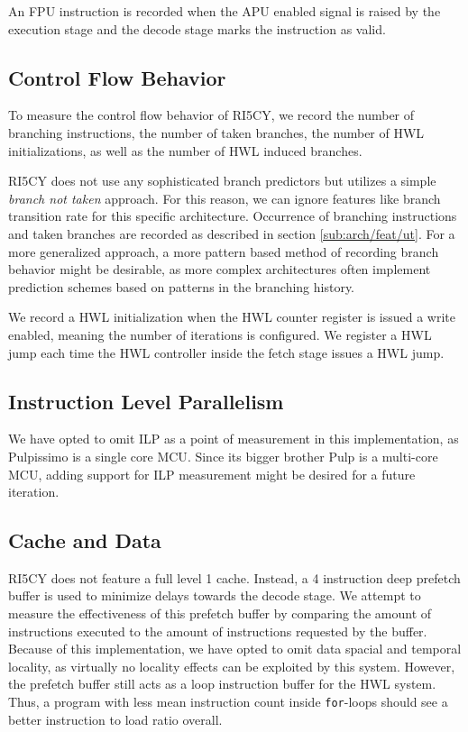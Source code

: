 \documentclass[../bachelor_paper.tex]{subfiles}
\begin{document}
An \ac{FPU} instruction is recorded when the \ac{APU} enabled signal is raised by the execution stage and the decode stage marks the instruction as valid.

\subsection{Control Flow Behavior}
    \label{sub:arch/feat/ctrl}
To measure the control flow behavior of RI5CY, we record the number of branching instructions, the number of taken branches, the number of \ac{HWL} initializations, as well as the number of \ac{HWL} induced branches.

RI5CY does not use any sophisticated branch predictors but utilizes a simple \emph{branch not taken} approach. For this reason, we can ignore features like branch transition rate \cite{haungsBranchTransitionRate2000} for this specific architecture. Occurrence of branching instructions and taken branches are recorded as described in section \ref{sub:arch/feat/ut}. For a more generalized approach, a more pattern based method of recording branch behavior might be desirable, as more complex architectures often implement prediction schemes based on patterns in the branching history.

We record a \ac{HWL} initialization when the \ac{HWL} counter register is issued a write enabled, meaning the number of iterations is configured. We register a \ac{HWL} jump each time the \ac{HWL} controller inside the fetch stage issues a \ac{HWL} jump.

\subsection{Instruction Level Parallelism}
We have opted to omit \ac{ILP} as a point of measurement in this implementation, as Pulpissimo is a single core \ac{MCU}. Since its bigger brother Pulp \cite{pulliniMrWolfEnergyPrecision2019} is a multi-core \ac{MCU}, adding support for \ac{ILP} measurement might be desired for a future iteration.

\subsection{Cache and Data}
RI5CY does not feature a full level 1 cache. Instead, a 4 instruction deep prefetch buffer is used to minimize delays towards the decode stage. We attempt to measure the effectiveness of this prefetch buffer by comparing the amount of instructions executed to the amount of instructions requested by the buffer. Because of this implementation, we have opted to omit data spacial and temporal locality, as virtually no locality effects can be exploited by this system. However, the prefetch buffer still acts as a loop instruction buffer for the \ac{HWL} system. Thus, a program with less mean instruction count inside \texttt{for}-loops should see a better instruction to load ratio overall.
\end{document}
